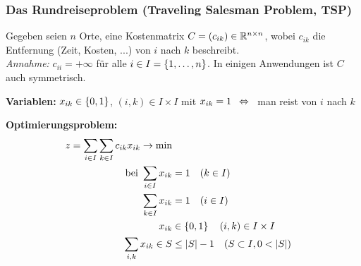 

\subsubsection{Das Rundreiseproblem (Traveling Salesman Problem, TSP)}

Gegeben seien $n$ Orte, eine Kostenmatrix $C = (c_{ik}) \in \mathbb{R}^{n \times n}$, wobei $c_{ik}$ die Entfernung (Zeit, Kosten, ...) von $i$ nach $k$ beschreibt. \\
\textit{Annahme:} $c_{ii} = + \infty$ für alle $i \in I = \left\{ 1, \dots, n \right\}$. In einigen Anwendungen ist $C$ auch symmetrisch.

\textbf{Variablen:} $x_{ik} \in \left\{ 0,1 \right\}$, $(i,k) \in I \times I$ mit $x_{ik} = 1 \enskip \Leftrightarrow \enskip $ man reist von $i$ nach $k$

\textbf{Optimierungsproblem:}
\begin{align}
	z = \sum_{i \in I} \sum_{k \in I} c_{ik} x_{ik} \to \min 
	\label{eq: 4.1} \\
	\text{ bei } \sum_{i \in I} x_{ik} &= 1 \quad (k \in I) 
	\label{eq: 4.2} \\
	\sum_{k \in I} x_{ik} &= 1 \quad (i \in I)
	\label{eq: 4.3} \\
	x_{ik} &\in \left\{ 0,1 \right\} \quad (i,k) \in I \times I 
	\label{eq: 4.4} \\
	\sum_{i,k} x_{ik} \in S &\le \left| S \right| - 1 \quad (S \subset I, 0 < \left| S \right|)
	\label{eq: 4.5} 
\end{align}

